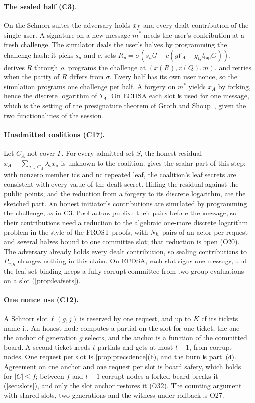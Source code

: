 \paragraph{The sealed half (C3).} On the Schnorr suites the adversary holds $x_{f}$ and every dealt contribution of the single user. A signature on a new message $m^*$ needs the user's contribution at a fresh challenge. The simulator deals the user's halves by programming the challenge hash: it picks $s_u$ and $c$, sets $R_u = \sigma(s_u G - c(g Y_A + g_Q t_{\mathsf{tap}} G))$, derives $R$ through $\rho$, programs the challenge at $(x(R), x(Q), m)$, and retries when the parity of $R$ differs from $\sigma$. Every half has its own user nonce, so the simulation programs one challenge per half. A forgery on $m^*$ yields $x_A$ by forking, hence the discrete logarithm of $Y_A$. On ECDSA each slot is used for one message, which is the setting of the presignature theorem of Groth and Shoup~\cite[Theorem~3]{GS21}, given the two functionalities of the session.

\paragraph{Unadmitted coalitions (C17).} Let $C_A$ not cover $\Gamma$. For every admitted set $S$, the honest residual $x_A - \sum_{a \in C_A} \lambda_a x_a$ is unknown to the coalition.  gives the scalar part of this step: with nonzero member ids and no repeated leaf, the coalition's leaf secrets are consistent with every value of the dealt secret. Hiding the residual against the public points, and the reduction from a forgery to its discrete logarithm, are the sketched part. An honest initiator's contributions are simulated by programming the challenge, as in C3. Pool actors publish their pairs before the message, so their contributions need a reduction to the algebraic one-more discrete logarithm problem in the style of the FROST proofs, with $N_{h}$ pairs of an actor per request and several halves bound to one committee slot; that reduction is open (O20). The adversary already holds every dealt contribution, so sealing contributions to $P_{v,g}$ changes nothing in this claim. On ECDSA, each slot signs one message, and the leaf-set binding keeps a fully corrupt committee from two group evaluations on a slot (\cref{prop:leafsets}).

\paragraph{One nonce use (C12).} A Schnorr slot $\ell(g, j)$ is reserved by one request, and up to $K$ of its tickets name it. An honest node computes a partial on the slot for one ticket, the one the anchor of generation $g$ selects, and the anchor is a function of the committed board. A second ticket needs $t$ partials and gets at most $t - 1$, from corrupt nodes. One request per slot is \cref{prop:precedence}(b), and the burn is part~(d). Agreement on one anchor and one request per slot is board safety, which holds for $|C| \le f$; between $f$ and $t - 1$ corrupt nodes a forked board breaks it (\cref{sec:slots}), and only the slot anchor restores it (O32). The counting argument with shared slots, two generations and the witness under rollback is O27.

